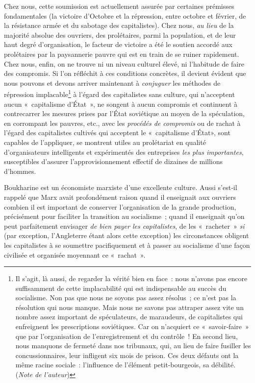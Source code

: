 \documentclass[french,twoside]{book} %
\begin{document}
Chez nous, cette soumission est actuellement assurée par certaines prémisses fondamentales (la victoire d’Octobre et la répression, entre octobre et février, de la résistance armée et du sabotage des capitalistes). Chez nous, \emph{au lieu} de la majorité absolue des ouvriers, des prolétaires, parmi la population, et de leur haut degré d’organisation, le facteur de victoire a été le soutien accordé aux prolétaires par la paysannerie pauvre qui est en train de se ruiner rapidement. Chez nous, enfin, on ne trouve ni un niveau culturel élevé, ni l’habitude de faire des compromis. Si l’on réfléchit à ces conditions concrètes, il devient évident que nous pouvons et devons arriver maintenant à \emph{conjuguer} les méthodes de répression implacable\footnote{Il s’agit, là aussi, de regarder la vérité bien en face : nous n’avons pas encore suffisamment de cette implacabilité qui est indispensable au succès du socialisme. Non pas que nous ne soyons pas assez résolus ; ce n’est pas la résolution qui nous manque. Mais nous ne savons pas attraper assez vite un nombre assez important de spéculateurs, de maraudeurs, de capitalistes qui enfreignent les prescriptions soviétiques. Car on n’acquiert ce « savoir‑faire » que par l’organisation de l’enregistrement et du contrôle ! En second lieu, nous manquons de fermeté dans nos tribunaux, qui, au lieu de faire fusiller les concussionnaires, leur infligent six mois de prison. Ces deux défauts ont la même racine sociale : l’influence de l’élément petit‑bourgeois, sa débilité. (\emph{Note de l’auteur})} à l’égard des capitalistes sans culture, qui n’acceptent aucun « capitalisme d’État », ne songent à aucun compromis et continuent à contrecarrer les mesures prises par l’État soviétique au moyen de la spéculation, en corrompant les pauvres, etc., avec les \emph{procédés de compromis} ou de rachat à l’égard des capitalistes cultivés qui acceptent le « capitalisme d’État», sont capables de l’appliquer, se montrent utiles au prolétariat en qualité d’organisateurs intelligents et expérimentés des entreprises \emph{les plus importantes}, susceptibles d’assurer l’approvisionnement effectif de dizaines de millions d’hommes.\par
Boukharine est un économiste marxiste d’une excellente culture. Aussi s’est‑il rappelé que Marx avait profondément raison quand il enseignait aux ouvriers combien il est important de conserver l’organisation de la grande production, précisément pour faciliter la transition au socialisme ; quand il enseignait qu’on peut parfaitement envi­sager \emph{de bien payer les capitalistes}, de les « racheter » \emph{si} (par exception, l’Angleterre étant alors cette exception) les circonstances obligent les capitalistes à se soumettre paci­fiquement et à passer au socialisme d’une façon civilisée et organisée moyennant ce \hspace{1em}« rachat ».\par
\end{document}
